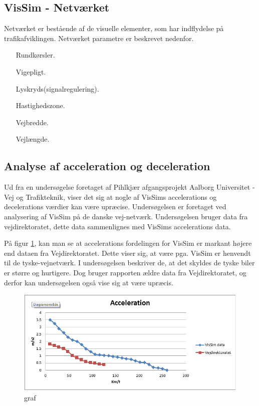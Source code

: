 \subsection{VisSim - Netværket}
Netværket er bestående af de visuelle elementer, som har indflydelse på trafikafviklingen.
Netværket parametre er beskrevet nedenfor.

\begin{itemize}
\item[Rundkørsler.]
\item[Vigepligt.]
\item[Lyskryds(signalregulering).]
\item[Hastighedszone.]
\item[Vejbredde.]
\item[Vejlængde.]
\end{itemize}

\subsection{Analyse af acceleration og deceleration}
Ud fra en undersøgelse foretaget af Pihlkjær afgangsprojekt Aalborg Universitet - Vej og Trafikteknik, viser det sig at nogle af VisSims accelerations og decelerations værdier kan være upræcise. Undersøgelsen er foretaget ved analysering af VisSim på de danske vej-netværk.  Undersøgelsen bruger data fra vejdirektoratet, dette data sammenlignes med VisSims accelerations data.

På figur \ref{GrafForAccelerationVisSim}, kan man se at accelerations fordelingen for VisSim er markant højere end dataen fra Vejdirektoratet. Dette viser sig, at være pga. VisSim er henvendt til de tyske-vejnetværk. I undersøgelsen beskriver de, at det skyldes de tyske biler er større og hurtigere. Dog bruger rapporten ældre data fra Vejdirektoratet, og derfor kan undersøgelsen også vise sig at være upræcis.

\begin{figure}
\begin{center}
\includegraphics[width=1.0\textwidth]{Pictures/Teknologianalyse/GrafForAccelerationVisSim.png}
\end{center}
\label{GrafForAccelerationVisSim}
\caption{graf}
\end{figure}

